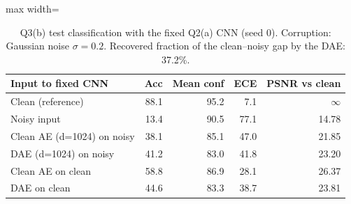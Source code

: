 \begin{table}[t]
\centering
\footnotesize
\setlength{\tabcolsep}{3.5pt}
\begin{adjustbox}{max width=\linewidth}
\begin{tabular}{lrrrr}
\toprule
Input to fixed CNN & Acc & Mean conf & ECE & PSNR vs clean \\
\midrule
Clean (reference) & 88.1 & 95.2 & 7.1 & $\infty$ \\
Noisy input & 13.4 & 90.5 & 77.1 & 14.78 \\
Clean AE (d=1024) on noisy & 38.1 & 85.1 & 47.0 & 21.85 \\
DAE (d=1024) on noisy & 41.2 & 83.0 & 41.8 & 23.20 \\
Clean AE on clean & 58.8 & 86.9 & 28.1 & 26.37 \\
DAE on clean & 44.6 & 83.3 & 38.7 & 23.81 \\
\bottomrule
\end{tabular}
\end{adjustbox}
\caption{Q3(b) test classification with the fixed Q2(a) CNN (seed 0). Corruption: Gaussian noise $\sigma=0.2$. Recovered fraction of the clean--noisy gap by the DAE: 37.2\%.}
\label{tab:q3b}
\end{table}
